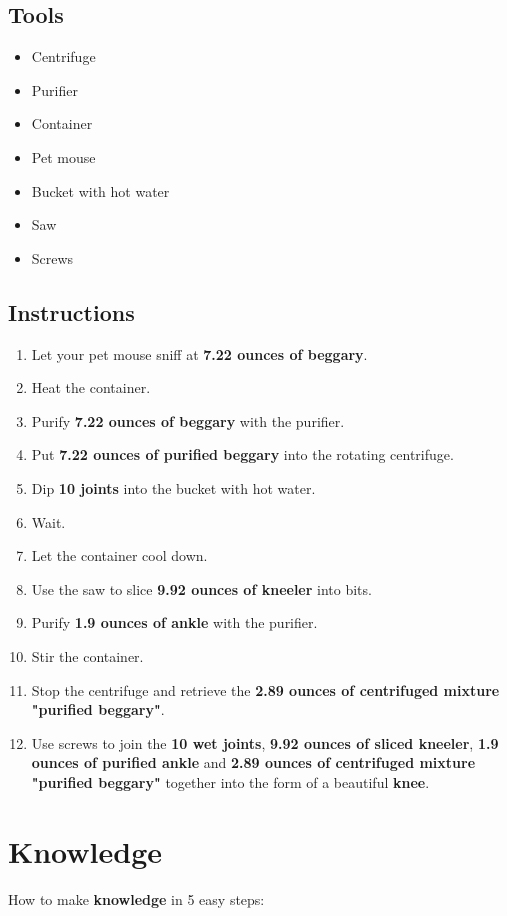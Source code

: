 \documentclass{article}
\begin{document}
\subsection{Tools}\begin{itemize}
\item 
Centrifuge
\item 
Purifier
\item 
Container
\item 
Pet mouse
\item 
Bucket with hot water
\item 
Saw
\item 
Screws
\end{itemize}
\subsection{Instructions}\begin{enumerate}
\item 
Let your pet mouse sniff at \textbf{7.22 ounces of beggary}.
\item 
Heat the container.
\item 
Purify \textbf{7.22 ounces of beggary} with the purifier.
\item 
Put \textbf{7.22 ounces of purified beggary} into the rotating centrifuge.
\item 
Dip \textbf{10 joints} into the bucket with hot water.
\item 
Wait.
\item 
Let the container cool down.
\item 
Use the saw to slice \textbf{9.92 ounces of kneeler} into bits.
\item 
Purify \textbf{1.9 ounces of ankle} with the purifier.
\item 
Stir the container.
\item 
Stop the centrifuge and retrieve the \textbf{2.89 ounces of centrifuged mixture "purified beggary"}.
\item 
Use screws to join the \textbf{10 wet joints}, \textbf{9.92 ounces of sliced kneeler}, \textbf{1.9 ounces of purified ankle} and \textbf{2.89 ounces of centrifuged mixture "purified beggary"} together into the form of a beautiful \textbf{knee}.
\end{enumerate}
\newpage
\section{Knowledge}How to make \textbf{knowledge} in 5 easy steps:
\end{document}
